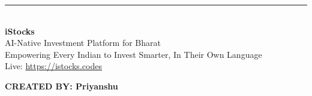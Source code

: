 \documentclass[11pt,a4paper]{article}
\begin{document}
\vspace{2cm}

\begin{center}
\rule{0.4\textwidth}{0.5pt}
\end{center}

\vfill

\begin{center}
    \textcolor{primary}{\Large\faChartLine}\\[0.5cm]
    {\large\textbf{iStocks}}\\[0.2cm]
    {\small AI-Native Investment Platform for Bharat}\\[0.3cm]
    {\small Empowering Every Indian to Invest Smarter, In Their Own Language}\\[1cm]
    
    \textcolor{textgray}{\small Live: \url{https://istocks.codes}}
\end{center}

\vspace{2cm}

\begin{flushright}
    \textbf{CREATED BY: Priyanshu}
\end{flushright}
\end{document}
